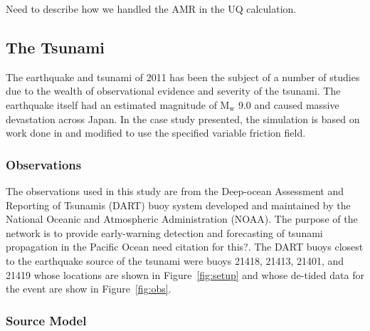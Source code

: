 \alert{Need to describe how we handled the AMR in the UQ calculation.}

\subsection{The \tohoku Tsunami} \label{ssub:tohoku}

The \tohoku earthquake and tsunami of 2011 has been the subject of a number of studies due to the wealth of observational evidence and severity of the tsunami.  The earthquake itself had an estimated magnitude of $\text{M}_\text{w}$ 9.0 and caused massive devastation across Japan.  In the case study presented, the simulation is based on work done in \cite{MacInnes:2013cr} and modified to use the specified variable friction field.

\subsubsection{Observations}

The observations used in this study are from the Deep-ocean Assessment and Reporting of Tsunamis (DART) buoy system developed and maintained by the National Oceanic and Atmospheric Administration (NOAA).  The purpose of the network is to provide early-warning detection and forecasting of tsunami propagation in the Pacific Ocean \alert{need citation for this?}.  The DART buoys closest to the earthquake source of the \tohoku tsunami were buoys 21418, 21413, 21401, and 21419 whose locations are shown in Figure~\ref{fig:setup} and whose de-tided data for the event are show in Figure~\ref{fig:obs}.


\subsubsection{Source Model}

